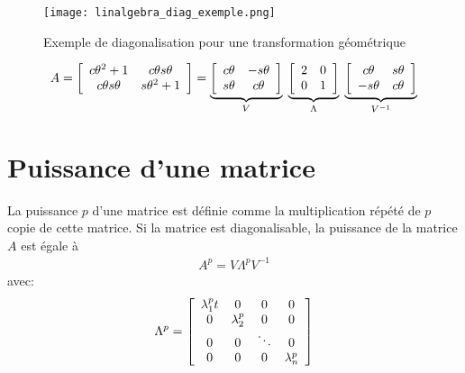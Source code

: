 \begin{figure}[H]
	\centering
		\texttt{[image: linalgebra\_diag\_exemple.png]}
	\caption{Exemple de diagonalisation pour une transformation géométrique}
	\label{fig:linalgebra_diag_exemple}
\end{figure}

\begin{align}
A =
\left[ \begin{array}{c c}  
c\theta^2+1     & c\theta s\theta \\
c\theta s\theta & s\theta^2+1
\end{array} \right]
=
\underbrace{
\left[ \begin{array}{c c}  
c\theta & - s\theta \\ 
s\theta &   c\theta 
\end{array} \right]
}_{V}
\;
\underbrace{
\left[ \begin{array}{c c}  
2 & 0 \\
0 & 1 
\end{array} \right]
}_{\Lambda}
\;
\underbrace{
\left[ \begin{array}{c c}  
c\theta &   s\theta \\ 
- s\theta &   c\theta 
\end{array} \right]
}_{V^{-1}}
\end{align}









\section{Puissance d'une matrice}

La puissance $p$ d'une matrice est définie comme la multiplication répété de $p$ copie de cette matrice. Si la matrice est diagonalisable, la puissance de la matrice $A$ est égale à
\begin{align}
A^p = V \Lambda^p V^{-1}
\label{eq:matrixpower}
\end{align}
avec:
\begin{align}
\Lambda^p = 
\left[ \begin{array}{c c c c}  
\lambda_1^p t &  0          & 0 & 0 \\
0         &  \lambda_2^p  & 0      & 0 \\
0         &  0          &\ddots  & 0 \\
0         &  0          & 0  & \lambda_n^p
\end{array} \right]
\end{align}


